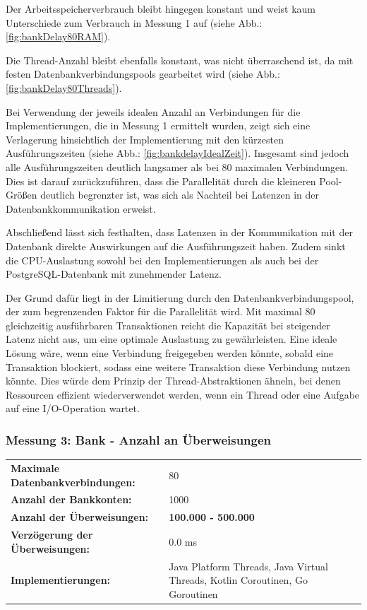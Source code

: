 \documentclass[fontsize=12pt,paper=a4,twoside=semi,parskip=half-,headsepline,headinclude]{scrreprt}
\begin{document}
Der Arbeitsspeicherverbrauch bleibt hingegen konstant und weist kaum Unterschiede zum Verbrauch in Messung 1 auf (siehe Abb.: \ref{fig:bankDelay80RAM}).

Die Thread-Anzahl bleibt ebenfalls konstant, was nicht überraschend ist, da mit festen Datenbankverbindungspools gearbeitet wird (siehe Abb.: \ref{fig:bankDelay80Threads}).

Bei Verwendung der jeweils idealen Anzahl an Verbindungen für die Implementierungen, die in Messung 1 ermittelt wurden, zeigt sich eine Verlagerung hinsichtlich der Implementierung mit den kürzesten Ausführungszeiten (siehe Abb.: \ref{fig:bankdelayIdealZeit}). Insgesamt sind jedoch alle Ausführungszeiten deutlich langsamer als bei 80 maximalen Verbindungen. Dies ist darauf zurückzuführen, dass die Parallelität durch die kleineren Pool-Größen deutlich begrenzter ist, was sich als Nachteil bei Latenzen in der Datenbankkommunikation erweist.

Abschließend lässt sich festhalten, dass Latenzen in der Kommunikation mit der Datenbank direkte Auswirkungen auf die Ausführungszeit haben. Zudem sinkt die CPU-Auslastung sowohl bei den Implementierungen als auch bei der PostgreSQL-Datenbank mit zunehmender Latenz.

Der Grund dafür liegt in der Limitierung durch den Datenbankverbindungspool, der zum begrenzenden Faktor für die Parallelität wird. Mit maximal 80 gleichzeitig ausführbaren Transaktionen reicht die Kapazität bei steigender Latenz nicht aus, um eine optimale Auslastung zu gewährleisten. Eine ideale Lösung wäre, wenn eine Verbindung freigegeben werden könnte, sobald eine Transaktion blockiert, sodass eine weitere Transaktion diese Verbindung nutzen könnte. Dies würde dem Prinzip der Thread-Abstraktionen ähneln, bei denen Ressourcen effizient wiederverwendet werden, wenn ein Thread oder eine Aufgabe auf eine I/O-Operation wartet.

\subsubsection{Messung 3: Bank - Anzahl an Überweisungen}

\begin{tabularx}{\textwidth}{@{}lX@{}}
	\textbf{Maximale Datenbankverbindungen:} & 80 \\
	\textbf{Anzahl der Bankkonten:} & 1000 \\
	\textbf{Anzahl der Überweisungen:} & \textbf{100.000 - 500.000} \\
	\textbf{Verzögerung der Überweisungen:} & 0.0 ms \\
	\textbf{Implementierungen:} & Java Platform Threads, Java Virtual Threads, Kotlin Coroutinen, Go Goroutinen
\end{tabularx}
\end{document}
